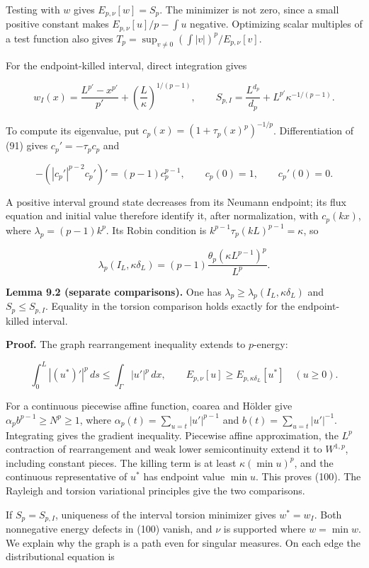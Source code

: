 \documentclass[11pt]{article}
\begin{document}
Testing with \(w\) gives \(E_{p,\nu}[w]=S_p\). The minimizer is not
zero, since a small positive constant makes \(E_{p,\nu}[u]/p-\int u\)
negative. Optimizing scalar multiples of a test function also gives
\(T_p=\sup_{v\ne0}(\int|v|)^p/E_{p,\nu}[v]\).

For the endpoint-killed interval, direct integration gives

\[
w_I(x)=\frac{L^{p'}-x^{p'}}{p'}
 +\left(\frac L\kappa\right)^{1/(p-1)},
\qquad
S_{p,I}=\frac{L^{d_p}}{d_p}+L^{p'}\kappa^{-1/(p-1)}.
\tag{97}
\]

To compute its eigenvalue, put \(c_p(x)=(1+\tau_p(x)^p)^{-1/p}\).
Differentiation of (91) gives \(c_p'=-\tau_pc_p\) and

\[
-(|c_p'|^{p-2}c_p')'=(p-1)c_p^{p-1},
\qquad c_p(0)=1,\qquad c_p'(0)=0.
\tag{98}
\]

A positive interval ground state decreases from its Neumann endpoint;
its flux equation and initial value therefore identify it, after
normalization, with \(c_p(kx)\), where \(\lambda_p=(p-1)k^p\). Its Robin
condition is \(k^{p-1}\tau_p(kL)^{p-1}=\kappa\), so

\[
\lambda_p(I_L,\kappa\delta_L)
=(p-1)\frac{\theta_p(\kappa L^{p-1})^p}{L^p}.
\tag{99}
\]

\textbf{Lemma 9.2 (separate comparisons).} One has
\(\lambda_p\ge\lambda_p(I_L,\kappa\delta_L)\) and \(S_p\le S_{p,I}\).
Equality in the torsion comparison holds exactly for the endpoint-killed
interval.

\textbf{Proof.} The graph rearrangement inequality extends to
\(p\)-energy:

\[
\int_0^L|(u^*)'|^p\,ds\le\int_\Gamma|u'|^p\,dx,
\qquad
E_{p,\nu}[u]\ge E_{p,\kappa\delta_L}[u^*]
\quad(u\ge0).
\tag{100}
\]

For a continuous piecewise affine function, coarea and Hölder give
\(\alpha_pb^{p-1}\ge N^p\ge1\), where
\(\alpha_p(t)=\sum_{u=t}|u'|^{p-1}\) and \(b(t)=\sum_{u=t}|u'|^{-1}\).
Integrating gives the gradient inequality. Piecewise affine
approximation, the \(L^p\) contraction of rearrangement and weak lower
semicontinuity extend it to \(W^{1,p}\), including constant pieces. The
killing term is at least \(\kappa(\min u)^p\), and the continuous
representative of \(u^*\) has endpoint value \(\min u\). This proves
(100). The Rayleigh and torsion variational principles give the two
comparisons.

If \(S_p=S_{p,I}\), uniqueness of the interval torsion minimizer gives
\(w^*=w_I\). Both nonnegative energy defects in (100) vanish, and
\(\nu\) is supported where \(w=\min w\). We explain why the graph is a
path even for singular measures. On each edge the distributional
equation is
\end{document}

